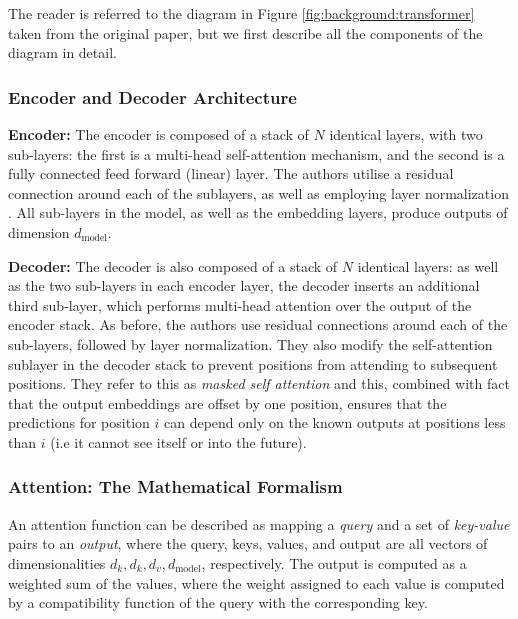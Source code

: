 {{The reader is referred to the diagram in Figure \ref{fig:background:transformer} taken from the original paper, but we first describe all the components of the diagram in detail.

\subsubsection{Encoder and Decoder Architecture}
\textbf{Encoder:} The encoder is composed of a stack of $N$ identical layers, with two sub-layers: the first is a multi-head self-attention mechanism, and the second is a fully connected feed forward (linear) layer. The authors utilise a residual connection \cite{He2015} around each of the sublayers, as well as employing layer normalization \cite{Ba2016}. All sub-layers in the model, as well as the embedding layers, produce outputs of dimension $d_\text{model}$.

\noindent \textbf{Decoder:} The decoder is also composed of a stack of $N$ identical layers: as well as the two sub-layers in each encoder layer, the decoder inserts an additional third sub-layer, which performs multi-head attention over the output of the encoder stack. As before, the authors use residual connections around each of the sub-layers, followed by layer normalization. They also modify the self-attention sublayer in the decoder stack to prevent positions from attending to subsequent positions. They refer to this as \textit{masked self attention} and this, combined with fact that the output embeddings are offset by one position, ensures that the predictions for position $i$ can depend only on the known outputs at positions less than $i$ (i.e it cannot see itself or into the future).

\subsubsection{Attention: The Mathematical Formalism}
An attention function can be described as mapping a \textit{query} and a set of \textit{key-value} pairs to an \textit{output}, where the query, keys, values, and output are all vectors of dimensionalities $d_k, d_k, d_v, d_\text{model}$, respectively. The output is computed as a weighted sum of the values, where the weight assigned to each value is computed by a compatibility function of the query with the corresponding key.

}}

